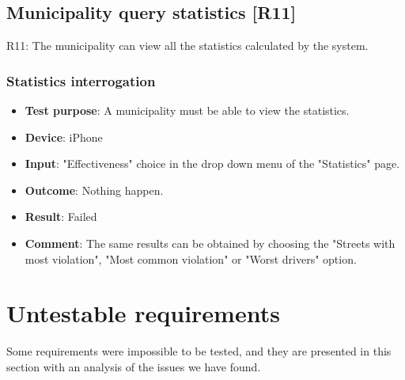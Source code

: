 \documentclass[../ATD.tex]{subfiles}
\begin{document}
    \subsection{Municipality query statistics [R11]}\label{subsec:municipality-query-statistics}
    R11: The municipality can view all the statistics calculated by the system.

    \subsubsection{Statistics interrogation}\label{subsubsec:statistics-interrogation}
    \begin{itemize}
        \item \textbf{Test purpose}: A municipality must be able to view the statistics.
        \item \textbf{Device}: iPhone
        \item \textbf{Input}: "Effectiveness" choice in the drop down menu of the "Statistics" page.
        \item \textbf{Outcome}: Nothing happen.
        \item \textbf{Result}: Failed
        \item \textbf{Comment}: The same results can be obtained by choosing the "Streets with most violation", "Most common violation" or "Worst drivers" option.
    \end{itemize}

    \section{Untestable requirements}\label{sec:untestable-requirements}
    Some requirements were impossible to be tested, and they are presented in this section with an analysis of the issues we have found.
\end{document}
